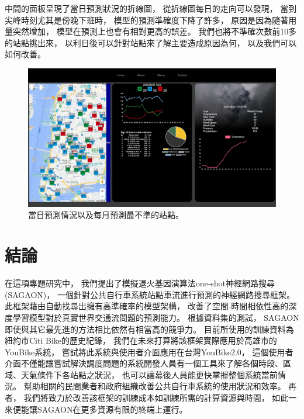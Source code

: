 \documentclass[a4paper,12pt]{extarticle}
\begin{document}
            中間的面板呈現了當日預測狀況的折線圖，
            從折線圖每日的走向可以發現，
            當到尖峰時刻尤其是傍晚下班時，
            模型的預測準確度下降了許多，
            原因是因為隨著用量突然增加，
            模型在預測上也會有相對更高的誤差。
            我們也將不準確次數前10多的站點挑出來，
            以利日後可以針對站點來了解主要造成原因為何，
            以及我們可以如何改善。
            \begin{figure}[htbp]
                \centering
                \includegraphics[width=\textwidth]{details.png}
                \caption{
                    當日預測情況以及每月預測最不準的站點。
                }
                \label{fig:details}
            \end{figure}

    \newpage
    \section{結論}
        
        在這項專題研究中，
        我們提出了模擬退火基因演算法one‑shot神經網路搜尋(SAGAON)，
        一個針對公共自行車系統站點車流進行預測的神經網路搜尋框架。
        此框架藉由自動找尋出擁有高準確率的模型架構，
        改善了空間-時間相依性高的深度學習模型對於真實世界交通流問題的預測能力。
        根據資料集的測試，
        SAGAON即使與其它最先進的方法相比依然有相當高的競爭力。
        目前所使用的訓練資料為紐約市Citi Bike的歷史紀錄，
        我們在未來打算將該框架實際應用於高雄市的YouBike系統，
        嘗試將此系統與使用者介面應用在台灣YouBike2.0，
        這個使用者介面不僅能讓嘗試解決調度問題的系統開發人員有一個工具來了解各個時段、區域、天氣條件下各站點之狀況，
        也可以讓幕後人員能更快掌握整個系統當前情況。
        幫助相關的民間業者和政府組織改善公共自行車系統的使用狀況和效率。
        再者，
        我們將致力於改善該框架的訓練成本如訓練所需的計算資源與時間，
        如此一來便能讓SAGAON在更多資源有限的終端上運行。
\end{document}
